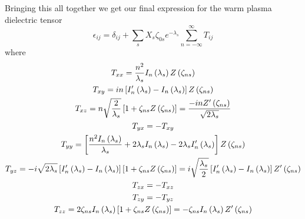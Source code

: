 Bringing this all together we get our final expression for the warm plasma dielectric tensor
\begin{equation} \label{hot_plasma_dielectric_generic_f}
	\epsilon_{ij} = \delta_{ij} + \sum_s X_s \zeta_{0s} e^{-\lambda_s} \sum_{n=-\infty}^\infty T_{ij}
\end{equation}
where
\begin{equation}
	\begin{gathered}
		T_{xx} = \frac{n^2}{\lambda_s} I_n \left( \lambda_s \right) Z \left( \zeta_{ns} \right) \\
		T_{xy} = in \left[ I_n' \left( \lambda_s \right) - I_n \left( \lambda_s \right) \right] Z \left( \zeta_{ns} \right) \\
		T_{xz} = n \sqrt{\frac{2}{\lambda_s}} \left[ 1 + \zeta_{ns} Z \left( \zeta_{ns} \right) \right] = \frac{-inZ' \left( \zeta_{ns} \right)}{\sqrt{2 \lambda_s}} \\
		T_{yx} = - T_{xy} \\
		T_{yy} = \left[ \frac{n^2 I_n \left( \lambda_s \right)}{\lambda_s} + 2\lambda_s I_n \left( \lambda_s \right) - 2\lambda_s I_n' \left( \lambda_s \right) \right] Z \left( \zeta_{ns} \right) \\
		T_{yz} = -i \sqrt{2 \lambda_s} \left[ I_n' \left( \lambda_s \right) - I_n \left( \lambda_s \right) \right] \left[ 1 + \zeta_{ns} Z \left( \zeta_{ns} \right) \right] = i \sqrt{\frac{\lambda_s}{2}} \left[ I_n' \left( \lambda_s \right) - I_n \left( \lambda_s \right) \right] Z' \left( \zeta_{ns} \right) \\
		T_{zx} = - T_{xz} \\
		T_{zy} = - T_{yz} \\
		T_{zz} = 2 \zeta_{ns} I_n \left( \lambda_s \right) \left[ 1 + \zeta_{ns} Z \left( \zeta_{ns} \right) \right] = - \zeta_{ns} I_n \left( \lambda_s \right) Z' \left( \zeta_{ns} \right)
	\end{gathered}
\end{equation}


